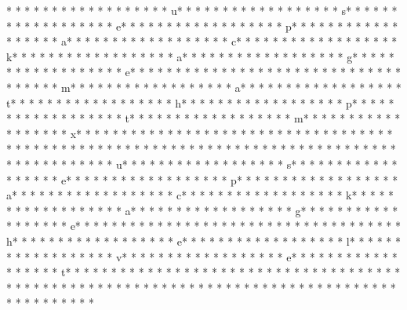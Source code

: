 * * *  * * *  * * *  *  * * *  *  * * *  * u* * *  * * *  * * *  *  * * *  *  * * *  * s* * *  * * *  * * *  *  * * *  *  * * *  * e* * *  * * *  * * *  *  * * *  *  * * *  * p* * *  * * *  * * *  *  * * *  *  * * *  * a* * *  * * *  * * *  *  * * *  *  * * *  * c* * *  * * *  * * *  *  * * *  *  * * *  * k* * *  * * *  * * *  *  * * *  *  * * *  * a* * *  * * *  * * *  *  * * *  *  * * *  * g* * *  * * *  * * *  *  * * *  *  * * *  * e* * *  * * *  * * *  *  * * *  *  * * *  * {* * *  * * *  * * *  *  * * *  *  * * *  * m* * *  * * *  * * *  *  * * *  *  * * *  * a* * *  * * *  * * *  *  * * *  *  * * *  * t* * *  * * *  * * *  *  * * *  *  * * *  * h* * *  * * *  * * *  *  * * *  *  * * *  * p* * *  * * *  * * *  *  * * *  *  * * *  * t* * *  * * *  * * *  *  * * *  *  * * *  * m* * *  * * *  * * *  *  * * *  *  * * *  * x* * *  * * *  * * *  *  * * *  *  * * *  * }* * *  * * *  * * *  *  * * *  *  * * *  *  * * *  * * *  * * *  *  * * *  *  * * *  *  * * *  * * *  * * *  *  * * *  *  * * *  * %
* * *  * * *  * * *  *  * * *  *  * * *  * u* * *  * * *  * * *  *  * * *  *  * * *  * s* * *  * * *  * * *  *  * * *  *  * * *  * e* * *  * * *  * * *  *  * * *  *  * * *  * p* * *  * * *  * * *  *  * * *  *  * * *  * a* * *  * * *  * * *  *  * * *  *  * * *  * c* * *  * * *  * * *  *  * * *  *  * * *  * k* * *  * * *  * * *  *  * * *  *  * * *  * a* * *  * * *  * * *  *  * * *  *  * * *  * g* * *  * * *  * * *  *  * * *  *  * * *  * e* * *  * * *  * * *  *  * * *  *  * * *  * {* * *  * * *  * * *  *  * * *  *  * * *  * h* * *  * * *  * * *  *  * * *  *  * * *  * e* * *  * * *  * * *  *  * * *  *  * * *  * l* * *  * * *  * * *  *  * * *  *  * * *  * v* * *  * * *  * * *  *  * * *  *  * * *  * e* * *  * * *  * * *  *  * * *  *  * * *  * t* * *  * * *  * * *  *  * * *  *  * * *  * }* * *  * * *  * * *  *  * * *  *  * * *  *  * * *  * * *  * * *  *  * * *  *  * * *  *  * * *  * * *  * * *  *  * * *  *  * * *  *  * * *  * * *  * * *  *  * * *  *  * * *  * %
